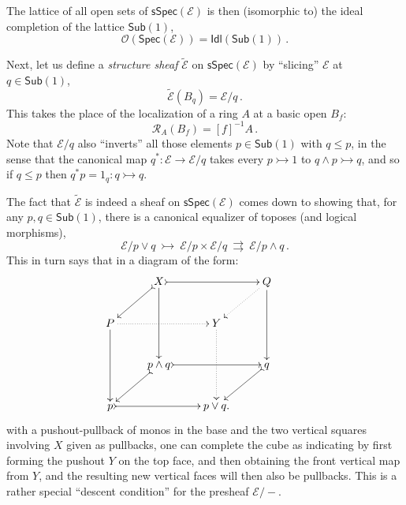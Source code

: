 \documentclass[12pt]{article}
\newcommand{\E}{\ensuremath{\mathcal{E}}}
\newcommand{\mono}{\ensuremath{\rightarrowtail}}
\theoremstyle{remark}
\theoremstyle{definition}
\begin{document}
The lattice of all open sets of $\mathsf{sSpec}(\E)$ is then (isomorphic to) the ideal completion of the lattice $\mathsf{Sub}(1)$,
$$\mathcal{O}(\mathsf{Spec}(\E)) = \mathsf{Idl}(\mathsf{Sub}(1))\,.$$

%



Next, let us define a \emph{structure sheaf} $\widetilde{\E}$ on $\mathsf{sSpec}(\E)$ by ``slicing'' $\E$ at $q \in\mathsf{Sub}(1)$,
\[
\widetilde{\E}(B_q) = \E/q\,.
\]
This takes the place of the localization of a ring $A$ at a basic open $B_f$:
\[
\mathcal{R}_A(B_f) = [f]^{-1}A\,.
\]
Note that $\E/q$ also ``inverts'' all those elements $p\in \mathsf{Sub}(1)$ with $q\leq p$, in the sense that the canonical map 
$q^* : \E \to \E/q$ takes every $p \mono 1$ to $q\wedge p \mono q$, and so if $q\leq p$ then $q^*p = 1_q : q \mono q$.

The fact that $\widetilde{\E}$ is indeed a sheaf on $\mathsf{sSpec}(\E)$ comes down to showing that, for any $p, q \in \mathsf{Sub}(1)$, there is a canonical equalizer of toposes (and logical morphisms),
\[
\E/p\vee q\ \mono\ \E/p \times \E/q\ \rightrightarrows\ \E/p\wedge q \,.
\]
This in turn says that in a diagram of the form: 
 \[ 
 \xymatrix{ 
& X \ar@{>->}[ld] \ar[dd] \ar@{>->}[rr] && Q \ar@{.>}[ld] \ar[dd] & \\
 P \ar[dd] \ar@{.>}[rr] && Y \ar@{.>}[dd]\\ 
 & p \wedge q \ar@{>->}[ld] \ar@{>->}[rr] && q \ar@{>->}[ld] & \\
  p \ar@{>->}[rr] && p\vee q .} 
 \] 
 with a pushout-pullback of monos in the base and the two vertical squares involving $X$ given as pullbacks, one can complete the cube as indicating by first forming the pushout $Y$ on the top face, and then obtaining the front vertical map from $Y$, and the resulting new vertical faces will then also be pullbacks. This is a rather special ``descent condition'' for the presheaf $\E/-$.
 
\end{document}

